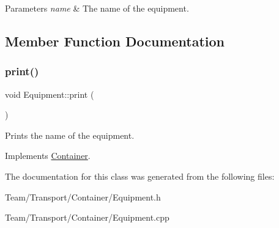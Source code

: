 \begin{DoxyParams}{Parameters}
{\em name} & The name of the equipment. \\
\hline
\end{DoxyParams}


\subsection{Member Function Documentation}
\mbox{\label{classEquipment_a78d184209461b59fe23dabe8f9325dfe}} 
\subsubsection{\texorpdfstring{print()}{print()}}
{\footnotesize\ttfamily void Equipment\+::print (\begin{DoxyParamCaption}{ }\end{DoxyParamCaption})\hspace{0.3cm}{\ttfamily [virtual]}}

Prints the name of the equipment. 

Implements \hyperlink{classContainer_a0056752dea3f0d49dc085b0284d86ec5}{Container}.



The documentation for this class was generated from the following files\+:\begin{DoxyCompactItemize}
\item 
Team/\+Transport/\+Container/Equipment.\+h\item 
Team/\+Transport/\+Container/Equipment.\+cpp\end{DoxyCompactItemize}
